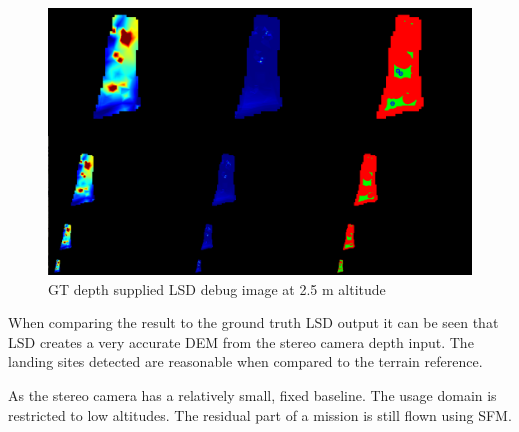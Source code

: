 \begin{figure}[ht!]
    \centering
    \includegraphics[scale=0.25]{images/stereo_camera_depth/GT_2.5m.png}
    \caption{GT depth supplied LSD debug image at 2.5 m altitude}
    \label{stereo_GT}
\end{figure}

When comparing the result to the ground truth LSD output it can be seen that LSD creates a very accurate DEM from the stereo camera depth input. The landing sites detected are reasonable when compared to the terrain reference. 

As the stereo camera has a relatively small, fixed baseline. The usage domain is restricted to low altitudes. The residual part of a mission is still flown using SFM. 






